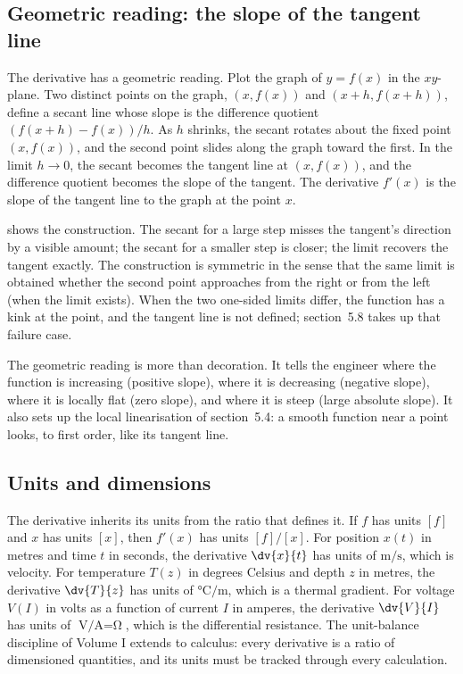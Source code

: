 \subsection{Geometric reading: the slope of the tangent line}

The derivative has a geometric reading. Plot the graph of $y =
f(x)$ in the $xy$-plane. Two distinct points on the graph,
$(x, f(x))$ and $(x + h, f(x + h))$, define a secant line whose
slope is the difference quotient $(f(x + h) - f(x)) / h$. As $h$
shrinks, the secant rotates about the fixed point $(x, f(x))$, and
the second point slides along the graph toward the first. In the
limit $h \to 0$, the secant becomes the tangent line at $(x,
f(x))$, and the difference quotient becomes the slope of the
tangent. The derivative $f'(x)$ is the slope of the tangent line
to the graph at the point $x$.



 shows the construction. The
secant for a large step misses the tangent's direction by a visible
amount; the secant for a smaller step is closer; the limit recovers
the tangent exactly. The construction is symmetric in the sense
that the same limit is obtained whether the second point approaches
from the right or from the left (when the limit exists). When the
two one-sided limits differ, the function has a kink at the point,
and the tangent line is not defined; section~5.8 takes up that
failure case.

The geometric reading is more than decoration. It tells the
engineer where the function is increasing (positive slope), where
it is decreasing (negative slope), where it is locally flat (zero
slope), and where it is steep (large absolute slope). It also
sets up the local linearisation of section~5.4: a smooth function
near a point looks, to first order, like its tangent line.

\subsection{Units and dimensions}

The derivative inherits its units from the ratio that defines it.
If $f$ has units $[f]$ and $x$ has units $[x]$, then $f'(x)$ has
units $[f]/[x]$. For position $x(t)$ in metres and time $t$ in
seconds, the derivative $\dv{x}{t}$ has units of
$\si{\meter\per\second}$, which is velocity. For temperature
$T(z)$ in degrees Celsius and depth $z$ in metres, the derivative
$\dv{T}{z}$ has units of $\si{\degreeCelsius\per\meter}$, which is
a thermal gradient. For voltage $V(I)$ in volts as a function of
current $I$ in amperes, the derivative $\dv{V}{I}$ has units of
$\si{\volt\per\ampere} = \si{\ohm}$, which is the differential
resistance. The unit-balance discipline of Volume I extends to
calculus: every derivative is a ratio of dimensioned quantities,
and its units must be tracked through every calculation.

